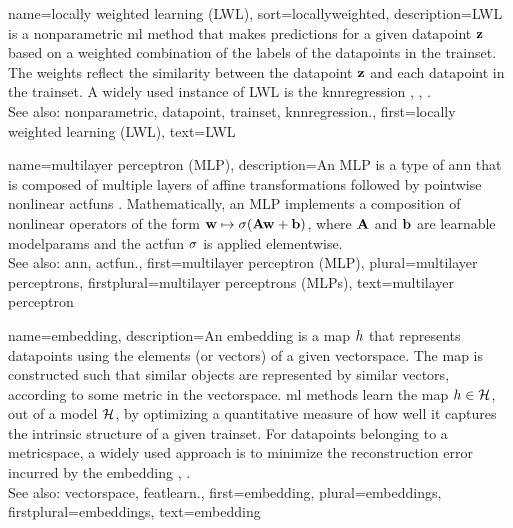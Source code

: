 {name={locally weighted learning (LWL)},
sort={locallyweighted},
	description={LWL is a \gls{nonparametric} \gls{ml} method 
		that makes \glspl{prediction} for a given \gls{datapoint} ${\bf z}$ based on a 
		weighted combination of the \glspl{label} of the \glspl{datapoint} in the \gls{trainset}. 
		The weights reflect the similarity between the \gls{datapoint} ${\bf z}$ and each 
		\gls{datapoint} in the \gls{trainset}. A widely used instance of LWL is the
		\gls{knnregression} \cite{MLBasics}, \cite{BishopBook}, \cite{LocallyWeightedLearning}.
				\\
		See also: \gls{nonparametric}, \gls{datapoint}, \gls{trainset}, \gls{knnregression}.}, 
	first={locally weighted learning (LWL)},
	text={LWL} 
}

{name={multilayer perceptron (MLP)},
	description={An MLP is a type of 
		\gls{ann} that is composed of multiple \glspl{layer} of affine 
		transformations followed by pointwise nonlinear \glspl{actfun} \cite{Goodfellow-et-al-2016}.
		Mathematically, an MLP implements a composition of nonlinear \glspl{operator} of the form
		${\bf w} \mapsto \sigma({\bf A} {\bf w} + {\bf b})$, where ${\bf A}$ and ${\bf b}$ are 
		learnable \glspl{modelparam} and the \gls{actfun} $\sigma$ is applied elementwise. 
		\\
		See also: \gls{ann}, \gls{actfun}.},
	first={multilayer perceptron (MLP)},
	plural={multilayer perceptrons},
	firstplural={multilayer perceptrons (MLPs)},
	text={multilayer perceptron}
}

{name={embedding},
	description={An  embedding is a \gls{map} $h$ that represents 
		\glspl{datapoint} using the elements (or \glspl{vector}) of a given \gls{vectorspace}. 
		The \gls{map} is constructed such that similar objects are represented by
		similar \glspl{vector}, according to some \gls{metric} in the \gls{vectorspace}. 
		\Gls{ml} methods learn the \gls{map} $h \in \mathcal{H}$, out of a \gls{model} $\mathcal{H}$, 
		by optimizing a quantitative \gls{measure} of how well it captures the intrinsic structure of a given 
		\gls{trainset}. For \glspl{datapoint} belonging to a \gls{metricspace}, a widely used approach is to 
		minimize the reconstruction error incurred by the embedding \cite{Goodfellow-et-al-2016}, \cite[Ch. 13]{BishopDeepLearning}.		
		\\
		See also: \gls{vectorspace}, \gls{featlearn}.},
	first={embedding},
	plural={embeddings},
	firstplural={embeddings},
	text={embedding}
}


